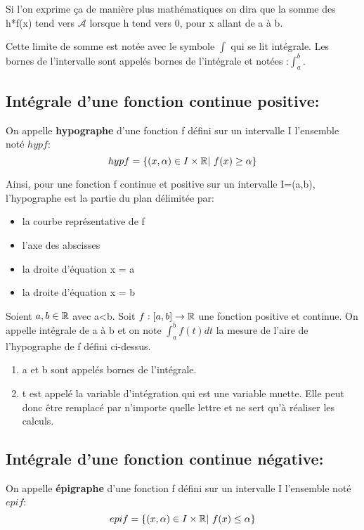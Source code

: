 Si l'on exprime ça de manière \og plus mathématiques\fg{} on dira que
la somme des h*f(x) tend vers $\mathcal{A}$ lorsque h tend vers 0,
pour x allant de a à b.

Cette limite de somme est notée avec le symbole $\int$ qui se lit
intégrale. Les bornes de l'intervalle sont appelés bornes de
l'intégrale et notées :$\int_a^b$.

\subsection{Intégrale d'une fonction continue positive: }
\begin{mydef}
  On appelle \textbf{hypographe} d'une fonction f défini sur un
  intervalle I l'ensemble noté $hyp f$:
  \[
    hyp f = \{ (x,\alpha) \in I \times \mathbb{R} | ~f(x) \geq \alpha \}
  \]
\end{mydef}

Ainsi, pour une fonction f continue et positive sur un intervalle I=(a,b),
l'hypographe est la partie du plan délimitée par:
\begin{itemize}
\item la courbe représentative de f
\item l'axe des abscisses
\item la droite d'équation x = a
\item la droite d'équation x = b
\end{itemize}

\begin{mydef}
  Soient $a,b \in \mathbb{R}$ avec a<b. Soit $f:[a,b] \to \mathbb{R}$  une fonction
  positive et continue. On appelle intégrale de a à b et on note
  $\int_a^b f(t) dt$ la mesure de l'aire de l'hypographe de f défini
  ci-dessus. 
\end{mydef} 

\begin{Rem}
  \begin{enumerate}[label = (\alph*), leftmargin=2cm]
  \item a et b sont appelés bornes de l'intégrale.
  \item t est appelé la variable d'intégration qui est une variable
    muette. Elle peut donc être remplacé par n'importe quelle lettre
    et ne sert qu'à réaliser les calculs.
  \end{enumerate}
\end{Rem}

\exemple{}

\subsection{Intégrale d'une fonction continue négative: }
\begin{mydef}
  On appelle \textbf{épigraphe} d'une fonction f défini sur un
  intervalle I l'ensemble noté $epi f$:
  \[
    epi f = \{ (x,\alpha) \in I \times \mathbb{R} | ~f(x) \leq \alpha \}
  \]
\end{mydef}

